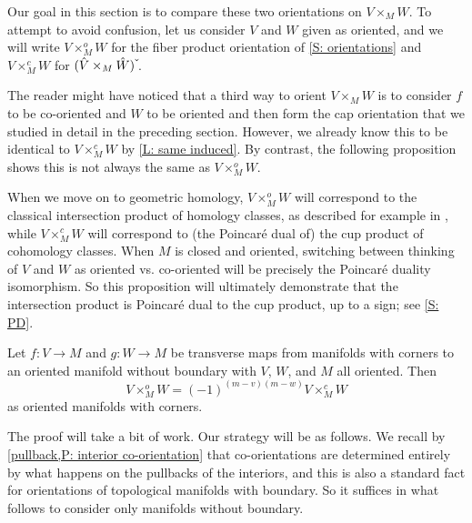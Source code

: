 Our goal in this section is to compare these two orientations on $V \times_M W$.
To attempt to avoid confusion, let us consider $V$ and $W$ given as oriented, and we will write $V \times_M^o W$ for the fiber product orientation of \cref{S: orientations} and $V \times_M^c W$ for $(\hat V \times_M \hat W)\,\check{\vrule height1.3ex width0pt}$.

The reader might have noticed that a third way to orient $V \times_M W$ is to consider $f$ to be co-oriented and $W$ to be oriented and then form the cap orientation that we studied in detail in the preceding section.
However, we already know this to be identical to $V \times_M ^cW$ by \cref{L: same induced}.
By contrast, the following proposition shows this is not always the same as $V \times_M^o W$.

When we move on to geometric homology, $V \times_M ^oW$ will correspond to the classical intersection product of homology classes, as described for example in \cite[Section VI.11]{Bred97}, while $V \times_M^c W$ will correspond to (the Poincar\'e dual of) the cup product of cohomology classes.
When $M$ is closed and oriented, switching between thinking of $V$ and $W$ as oriented vs. co-oriented will be precisely the Poincar\'e duality isomorphism.
So this proposition will ultimately demonstrate that the intersection product is Poincar\'e dual to the cup product, up to a sign; see \cref{S: PD}.

\begin{proposition}\label{P: compare cup and intersection orientations}
	Let $f \colon V \to M$ and $g \colon W \to M$ be transverse maps from manifolds with corners to an oriented manifold without boundary with $V$, $W$, and $M$ all oriented.
	Then $$V \times_M^o W = (-1)^{(m-v)(m-w)} V \times_M^c W$$ as oriented manifolds with corners.
\end{proposition}

The proof will take a bit of work.
Our strategy will be as follows.
We recall by \cref{pullback,P: interior co-orientation} that co-orientations are determined entirely by what happens on the pullbacks of the interiors, and this is also a standard fact for orientations of topological manifolds with boundary.
So it suffices in what follows to consider only manifolds without boundary.

